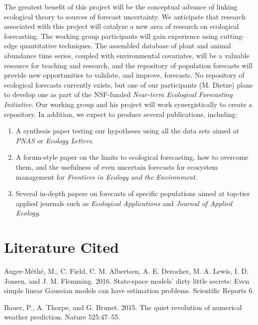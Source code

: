 \documentclass[12pt,]{article}
\providecommand{\tightlist}{%
  \setlength{\itemsep}{0pt}\setlength{\parskip}{0pt}}
\begin{document}
The greatest benefit of this project will be the conceptual advance of
linking ecological theory to sources of forecast uncertainty. We
anticipate that research associated with this project will catalyze a
new area of research on ecological forecasting. The working group
participants will gain experience using cutting-edge quantitative
techniques. The assembled database of plant and animal abundance time
series, coupled with environmental covariates, will be a valuable
resource for teaching and research, and the repository of population
forecasts will provide new opportunities to validate, and improve,
forecasts. No repository of ecological forecasts currently exists, but
one of our participants (M. Dietze) plans to develop one as part of the
NSF-funded \emph{Near-term Ecological Forecasting Initiative}. Our
working group and his project will work synergistically to create a
repository. In addition, we expect to produce several publications,
including:

\begin{enumerate}
\def\labelenumi{\arabic{enumi}.}
\tightlist
\item
  A synthesis paper testing our hypotheses using all the data sets aimed
  at \emph{PNAS} or \emph{Ecology Letters}.
\item
  A forum-style paper on the limits to ecological forecasting, how to
  overcome them, and the usefulness of even uncertain forecasts for
  ecosystem management for \emph{Frontiers in Ecology and the
  Environment}.
\item
  Several in-depth papers on forecasts of specific populations aimed at
  top-tier applied journals such as \emph{Ecological Applications} and
  \emph{Journal of Applied Ecology}.
\end{enumerate}

\hypertarget{literature-cited}{%
\section*{Literature Cited}\label{literature-cited}}

\hypertarget{refs}{}
\leavevmode\hypertarget{ref-Auger-Methe2016}{}%
Auger-Méthé, M., C. Field, C. M. Albertsen, A. E. Derocher, M. A. Lewis,
I. D. Jonsen, and J. M. Flemming. 2016. State-space models' dirty little
secrets: Even simple linear Gaussian models can have estimation
problems. Scientific Reports 6.

\leavevmode\hypertarget{ref-Bauer2015}{}%
Bauer, P., A. Thorpe, and G. Brunet. 2015. The quiet revolution of
numerical weather prediction. Nature 525:47--55.
\end{document}

